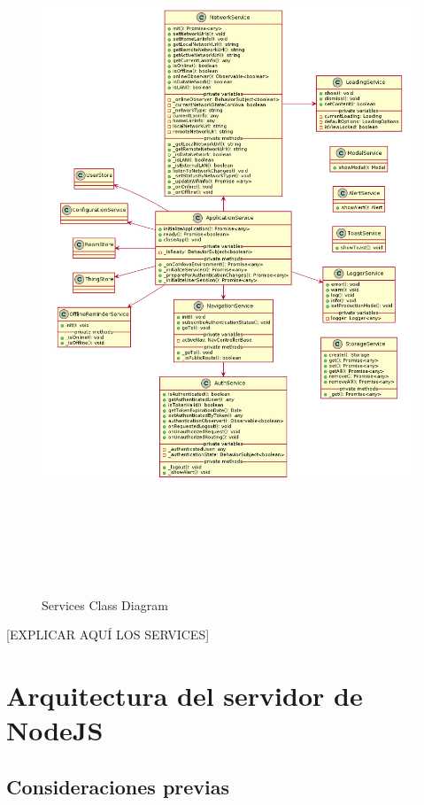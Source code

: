 \begin{figure}[hbt!]
\centering
\includegraphics[height=8.2in]{figures/diagrams/front/architecture/services.png}
\caption[services]{Services Class Diagram\footnotemark}
\end{figure}

[EXPLICAR AQUÍ LOS SERVICES]

\section{Arquitectura del servidor de NodeJS}
\label{ch:Capitulo4.7}

\subsection{Consideraciones previas}
\label{ch:Capitulo4.7.1}

